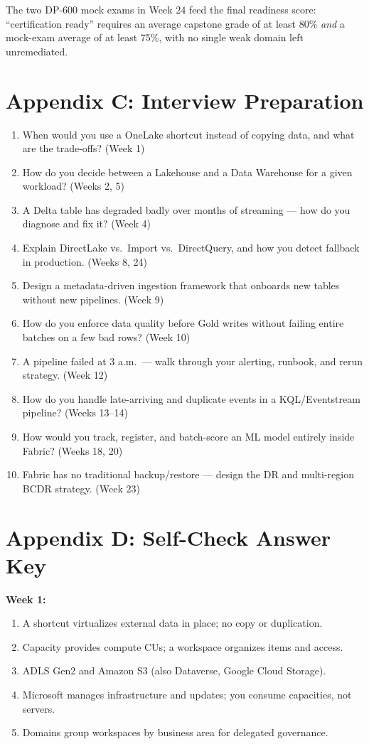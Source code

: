 \documentclass[11pt, a4paper]{article}
\begin{document}
\noindent The two DP-600 mock exams in Week 24 feed the final readiness score: ``certification ready'' requires an average capstone grade of at least 80\% \emph{and} a mock-exam average of at least 75\%, with no single weak domain left unremediated.

\section{Appendix C: Interview Preparation}
\begin{enumerate}
    \item When would you use a OneLake shortcut instead of copying data, and what are the trade-offs? (Week 1)
    \item How do you decide between a Lakehouse and a Data Warehouse for a given workload? (Weeks 2, 5)
    \item A Delta table has degraded badly over months of streaming --- how do you diagnose and fix it? (Week 4)
    \item Explain DirectLake vs.\ Import vs.\ DirectQuery, and how you detect fallback in production. (Weeks 8, 24)
    \item Design a metadata-driven ingestion framework that onboards new tables without new pipelines. (Week 9)
    \item How do you enforce data quality before Gold writes without failing entire batches on a few bad rows? (Week 10)
    \item A pipeline failed at 3 a.m.\ --- walk through your alerting, runbook, and rerun strategy. (Week 12)
    \item How do you handle late-arriving and duplicate events in a KQL/Eventstream pipeline? (Weeks 13--14)
    \item How would you track, register, and batch-score an ML model entirely inside Fabric? (Weeks 18, 20)
    \item Fabric has no traditional backup/restore --- design the DR and multi-region BCDR strategy. (Week 23)
\end{enumerate}

\section{Appendix D: Self-Check Answer Key}

\noindent\textbf{Week 1:}
\begin{enumerate}[leftmargin=8mm, itemsep=0pt]
    \item A shortcut virtualizes external data in place; no copy or duplication.
    \item Capacity provides compute CUs; a workspace organizes items and access.
    \item ADLS Gen2 and Amazon S3 (also Dataverse, Google Cloud Storage).
    \item Microsoft manages infrastructure and updates; you consume capacities, not servers.
    \item Domains group workspaces by business area for delegated governance.
\end{enumerate}
\end{document}
